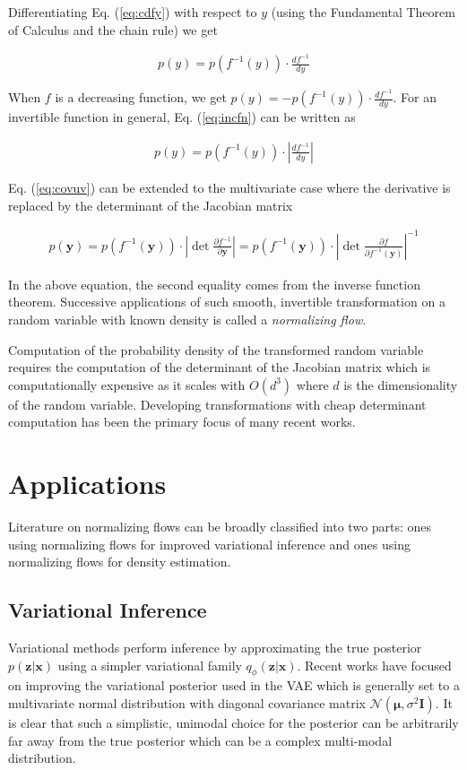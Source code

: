 \documentclass[runningheads]{llncs}
\begin{document}
Differentiating Eq. (\ref{eq:cdfy}) with respect to $y$ (using the Fundamental Theorem of Calculus and the chain rule) we get

\begin{align}
p(y) = p(f^{-1}(y))\cdot \frac{df^{-1}}{dy}
\label{eq:incfn}
\end{align}

When $f$ is a decreasing function, we get $p(y) = -p(f^{-1}(y))\cdot \frac{df^{-1}}{dy}$.  For an invertible function in general, Eq. (\ref{eq:incfn}) can be written as 

\begin{align}
p(y) = p(f^{-1}(y))\cdot \left|\frac{df^{-1}}{dy}\right|
\label{eq:covuv}
\end{align}

Eq. (\ref{eq:covuv}) can be extended to the multivariate case where the derivative is replaced by the determinant of the Jacobian matrix

\begin{align}
p(\mathbf{y}) = p(f^{-1}(\mathbf{y}))\cdot \left|\det\frac{\partial f^{-1}}{\partial\mathbf{y}}\right| = p(f^{-1}(\mathbf{y}))\cdot \left|\det\frac{\partial f}{\partial f^{-1}(\mathbf{y})}\right|^{-1}
\label{eq:covmv}
\end{align}

In the above equation, the second equality comes from the inverse function theorem. Successive applications of such smooth, invertible transformation on a random variable with known density is called a \textit{normalizing flow}.

 Computation of the probability density of the transformed random variable requires the computation of the determinant of the Jacobian matrix which is computationally expensive as it scales with $O(d^3)$ where $d$ is the dimensionality of the random variable. Developing transformations with cheap determinant computation has been the primary focus of many recent works.
\section{Applications}
Literature on normalizing flows can be broadly classified into two parts: ones using normalizing flows for improved variational inference and ones using normalizing flows for density estimation.
\subsection{Variational Inference}
Variational methods perform inference by approximating the true posterior $p(\mathbf{z}|\mathbf{x})$ using a simpler variational family $q_{\phi}(\mathbf{z}|\mathbf{x})$. Recent works have focused on improving the variational posterior used in the VAE which is generally set to a multivariate normal distribution with diagonal covariance matrix $\mathcal{N}(\bm{\mu}, \sigma^2\mathbf{I})$. It is clear that such a simplistic, unimodal choice for the posterior can be arbitrarily far away from the true posterior which can be a complex multi-modal distribution. 
\end{document}
